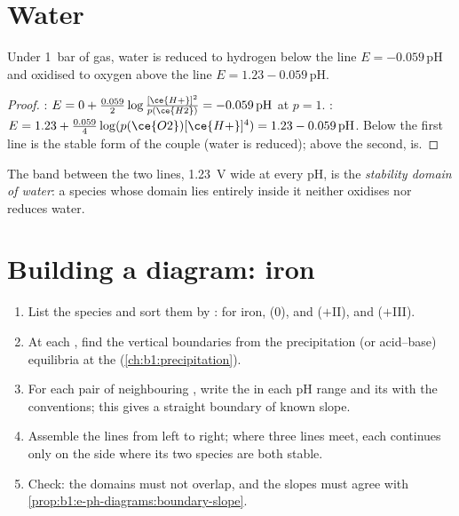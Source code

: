 \section{Water}

\begin{proposition}\label{prop:b1:e-ph-diagrams:water-lines}
Under \qty{1}{bar} of gas, water is reduced to hydrogen below the line
$E = -0.059\,\mathrm{pH}$ and oxidised to oxygen above the line $E = 1.23
- 0.059\,\mathrm{pH}$.
\end{proposition}

\begin{proof}
: $E = 0 + \frac{0.059}{2}\log\frac{[\ce{H+}]^2}{p(\ce{H2})}
= -0.059\,\mathrm{pH}$ at $p = 1$. : $E = 1.23 +
\frac{0.059}{4}\log(p(\ce{O2})[\ce{H+}]^4) = 1.23 - 0.059\,\mathrm{pH}$. Below
the first line  is the stable form of the couple (water is
reduced); above the second,  is.
\end{proof}

\begin{definition}\label{def:b1:e-ph-diagrams:water-domain}
The band between the two lines, \qty{1.23}{V} wide at every pH, is the
\emph{stability domain of water}: a
species whose domain lies entirely inside it neither oxidises nor reduces
water.
\end{definition}

\section{Building a diagram: iron}

\begin{method}\label{met:b1:e-ph-diagrams:build}
\begin{enumerate}
  \item List the species and sort them by : for iron,
         (0),  and  ($+$II),  and
         ($+$III).
  \item At each , find the vertical boundaries from the
        precipitation (or acid--base) equilibria at the  (\cref{ch:b1:precipitation}).
  \item For each pair of neighbouring , write the
         in each pH range and its  with the
        conventions; this gives a straight boundary of known slope.
  \item Assemble the lines from left to right; where three lines meet,
        each continues only on the side where its two species are both
        stable.
  \item Check: the domains must not overlap, and the slopes must agree
        with \cref{prop:b1:e-ph-diagrams:boundary-slope}.
\end{enumerate}
\end{method}

